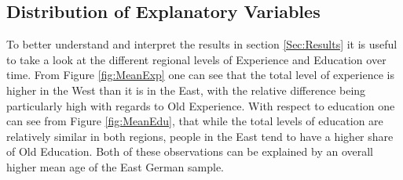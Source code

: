 \subsection{Distribution of Explanatory Variables}
To better understand and interpret the results in section \ref{Sec:Results} it is useful to take a look at the different regional levels of Experience and Education over time. 
From Figure \ref{fig:MeanExp} one can see that the total level of experience is higher in the West than it is in the East, with the relative difference being particularly high with regards to Old Experience. With respect to education one can see from Figure \ref{fig:MeanEdu}, that while the total levels of education are relatively similar in both regions, people in the East tend to have a higher share of Old Education. Both of these observations can be explained by an overall higher mean age of the East German sample.



\FloatBarrier